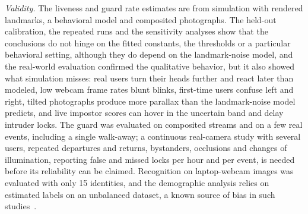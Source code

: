 \documentclass{ieeeaccess}
\begin{document}
\emph{Validity.} The liveness and guard rate estimates are from simulation with rendered landmarks, a behavioral model and composited photographs. The held-out calibration, the repeated runs and the sensitivity analyses show that the conclusions do not hinge on the fitted constants, the thresholds or a particular behavioral setting, although they do depend on the landmark-noise model, and the real-world evaluation confirmed the qualitative behavior, but it also showed what simulation misses: real users turn their heads further and react later than modeled, low webcam frame rates blunt blinks, first-time users confuse left and right, tilted photographs produce more parallax than the landmark-noise model predicts, and live impostor scores can hover in the uncertain band and delay intruder locks. The guard was evaluated on composited streams and on a few real events, including a single walk-away; a continuous real-camera study with several users, repeated departures and returns, bystanders, occlusions and changes of illumination, reporting false and missed locks per hour and per event, is needed before its reliability can be claimed. Recognition on laptop-webcam images was evaluated with only 15 identities, and the demographic analysis relies on estimated labels on an unbalanced dataset, a known source of bias in such studies~\cite{drozdowski2020bias}.

\end{document}
